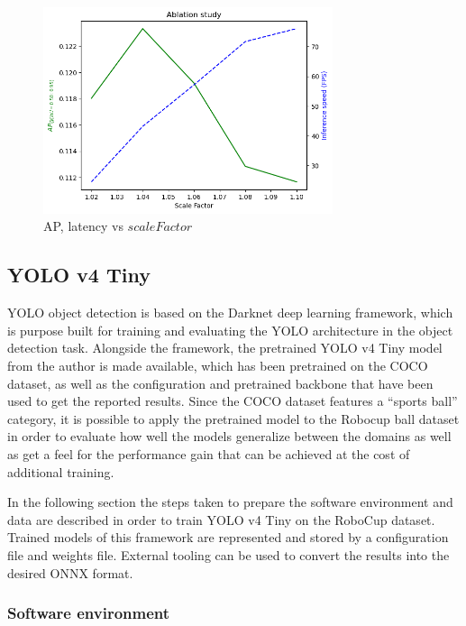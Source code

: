 \documentclass[a4paper,twoside,12pt]{report}
\begin{document}
\begin{figure}[h!]
\begin{center}
\includegraphics[width=8.5cm]{images/vj_ablation.png}
\caption{AP, latency vs $scaleFactor$}
\label{fig:vjspeeds}
\end{center}
\end{figure}

\subsection{YOLO v4 Tiny}

YOLO object detection is based on the Darknet deep learning framework, which is purpose built for training and evaluating the YOLO architecture in the object detection task. Alongside the framework, the pretrained YOLO v4 Tiny \citep{yolov4tiny} model from the author is made available, which has been pretrained on the COCO dataset, as well as the configuration and pretrained backbone that have been used to get the reported results. Since the COCO dataset features a ``sports ball'' category, it is possible to apply the pretrained model to the Robocup ball dataset in order to evaluate how well the models generalize between the domains as well as get a feel for the performance gain that can be achieved at the cost of additional training.

In the following section the steps taken to prepare the software environment and data are described in order to train YOLO v4 Tiny on the RoboCup dataset. Trained models of this framework are represented and stored by a configuration file and weights file. External tooling can be used to convert the results into the desired ONNX format. 

\subsubsection{Software environment}
\end{document}
